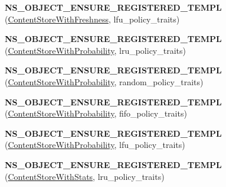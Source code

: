 \begin{DoxyCompactItemize}
\item 
{\bfseries N\+S\+\_\+\+O\+B\+J\+E\+C\+T\+\_\+\+E\+N\+S\+U\+R\+E\+\_\+\+R\+E\+G\+I\+S\+T\+E\+R\+E\+D\+\_\+\+T\+E\+M\+PL} (\hyperlink{classns3_1_1ndn_1_1cs_1_1ContentStoreWithFreshness}{Content\+Store\+With\+Freshness}, lfu\+\_\+policy\+\_\+traits)\hypertarget{namespacens3_1_1ndn_1_1cs_a85c95057bf8024b0680b457e9e8e6235}{}\label{namespacens3_1_1ndn_1_1cs_a85c95057bf8024b0680b457e9e8e6235}

\item 
{\bfseries N\+S\+\_\+\+O\+B\+J\+E\+C\+T\+\_\+\+E\+N\+S\+U\+R\+E\+\_\+\+R\+E\+G\+I\+S\+T\+E\+R\+E\+D\+\_\+\+T\+E\+M\+PL} (\hyperlink{classns3_1_1ndn_1_1cs_1_1ContentStoreWithProbability}{Content\+Store\+With\+Probability}, lru\+\_\+policy\+\_\+traits)\hypertarget{namespacens3_1_1ndn_1_1cs_a1cc809175c24fe83bc27eda600ac3e96}{}\label{namespacens3_1_1ndn_1_1cs_a1cc809175c24fe83bc27eda600ac3e96}

\item 
{\bfseries N\+S\+\_\+\+O\+B\+J\+E\+C\+T\+\_\+\+E\+N\+S\+U\+R\+E\+\_\+\+R\+E\+G\+I\+S\+T\+E\+R\+E\+D\+\_\+\+T\+E\+M\+PL} (\hyperlink{classns3_1_1ndn_1_1cs_1_1ContentStoreWithProbability}{Content\+Store\+With\+Probability}, random\+\_\+policy\+\_\+traits)\hypertarget{namespacens3_1_1ndn_1_1cs_a0d5f260568a0e5e2396c8f1d72d76f09}{}\label{namespacens3_1_1ndn_1_1cs_a0d5f260568a0e5e2396c8f1d72d76f09}

\item 
{\bfseries N\+S\+\_\+\+O\+B\+J\+E\+C\+T\+\_\+\+E\+N\+S\+U\+R\+E\+\_\+\+R\+E\+G\+I\+S\+T\+E\+R\+E\+D\+\_\+\+T\+E\+M\+PL} (\hyperlink{classns3_1_1ndn_1_1cs_1_1ContentStoreWithProbability}{Content\+Store\+With\+Probability}, fifo\+\_\+policy\+\_\+traits)\hypertarget{namespacens3_1_1ndn_1_1cs_a43304dfb592d3233709528ffa210ac0e}{}\label{namespacens3_1_1ndn_1_1cs_a43304dfb592d3233709528ffa210ac0e}

\item 
{\bfseries N\+S\+\_\+\+O\+B\+J\+E\+C\+T\+\_\+\+E\+N\+S\+U\+R\+E\+\_\+\+R\+E\+G\+I\+S\+T\+E\+R\+E\+D\+\_\+\+T\+E\+M\+PL} (\hyperlink{classns3_1_1ndn_1_1cs_1_1ContentStoreWithProbability}{Content\+Store\+With\+Probability}, lfu\+\_\+policy\+\_\+traits)\hypertarget{namespacens3_1_1ndn_1_1cs_af8d04c3783242cca2e5f76cc9e650178}{}\label{namespacens3_1_1ndn_1_1cs_af8d04c3783242cca2e5f76cc9e650178}

\item 
{\bfseries N\+S\+\_\+\+O\+B\+J\+E\+C\+T\+\_\+\+E\+N\+S\+U\+R\+E\+\_\+\+R\+E\+G\+I\+S\+T\+E\+R\+E\+D\+\_\+\+T\+E\+M\+PL} (\hyperlink{classns3_1_1ndn_1_1cs_1_1ContentStoreWithStats}{Content\+Store\+With\+Stats}, lru\+\_\+policy\+\_\+traits)\hypertarget{namespacens3_1_1ndn_1_1cs_a4d90ad70292eca8849d8f64dda1424bc}{}\label{namespacens3_1_1ndn_1_1cs_a4d90ad70292eca8849d8f64dda1424bc}


\end{DoxyCompactItemize}
